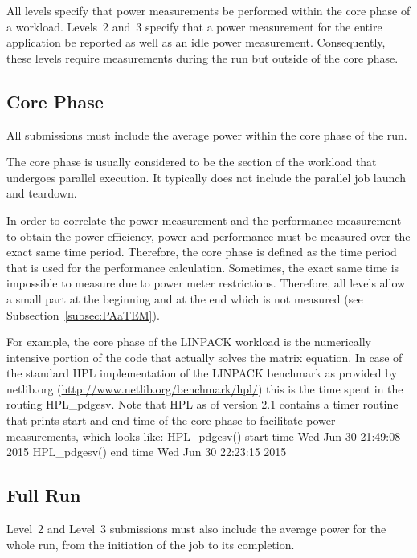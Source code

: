 All levels specify that power measurements be performed within the core phase of a workload.
Levels~2 and~3 specify that a power measurement for the entire application be reported as well as an idle power measurement.
Consequently, these levels require measurements during the run but outside of the core phase.

\subsection{Core Phase}
\label{subsec:core_phase}

All submissions must include the average power within the core phase of the run.

The core phase is usually considered to be the section of the workload that undergoes parallel execution.
It typically does not include the parallel job launch and teardown. %

In order to correlate the power measurement and the performance measurement to obtain the power efficiency, power and performance must be measured over the exact same time period.
Therefore, the core phase is defined as the time period that is used for the performance calculation.
Sometimes, the exact same time is impossible to measure due to power meter restrictions.
Therefore, all levels allow a small part at the beginning and at the end which is not measured (see Subsection~\ref{subsec:PAaTEM}).

For example, the core phase of the LINPACK workload is the numerically intensive portion of the code that actually solves the matrix equation.
In case of the standard \acs{HPL} implementation of the LINPACK benchmark as provided by netlib.org (\url{http://www.netlib.org/benchmark/hpl/}) this is the time spent in the routing {\ttfamily HPL\_pdgesv}.
Note that \acs{HPL} as of version 2.1 contains a timer routine that prints start and end time of the core phase to facilitate power measurements, which looks like:\newline
{\ttfamily
HPL\_pdgesv() start time Wed Jun 30 21:49:08 2015\newline
HPL\_pdgesv() end time Wed Jun 30 22:23:15 2015
}

\subsection{Full Run}
\label{subsec:full_run}

Level~2 and Level~3 submissions must also include the average power for the whole run, from the initiation of the job to its completion.

